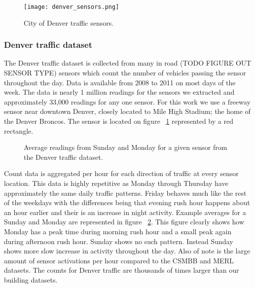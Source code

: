 \begin{figure}[t!]
	\begin{center}
		\texttt{[image: denver\_sensors.png]}
	\end{center}
	\caption{City of Denver traffic sensors.}
	\label{fig:denvertraffic}
\end{figure}


\subsubsection{Denver traffic dataset}
The Denver traffic dataset is collected from many in road (TODO FIGURE OUT SENSOR TYPE) sensors which count the number of vehicles passing the sensor throughout the day.  Data is available from 2008 to 2011 on most days of the week.  The data is nearly 1 million readings for the sensors we extracted and approximately 33,000 readings for any one sensor.  For this work we use a freeway sensor near downtown Denver, closely located to Mile High Stadium; the home of the Denver Broncos.  The sensor is located on figure ~\ref{fig:denvertraffic} represented by a red rectangle.

\begin{figure}[h]
	\begin{center}
	\end{center}
	\caption{Average readings from Sunday and Monday for a given sensor from the Denver traffic dataset.}
	\label{fig:denver_day_raw}
\end{figure}

Count data is aggregated per hour for each direction of traffic at every sensor location.  This data is highly repetitive as Monday through Thursday have approximately the same daily traffic patterns.  Friday behaves much like the rest of the weekdays with the differences being that evening rush hour happens about an hour earlier and their is an increase in night activity.   Example averages for a Sunday and Monday are represented in figure ~\ref{fig:denver_day_raw}.  This figure clearly shows how Monday has a peak time during morning rush hour and a small peak again during afternoon rush hour.  Sunday shows no such pattern.  Instead Sunday shows more slow increase in activity throughout the day.  Also of note is the large amount of sensor activations per hour compared to the CSMBB and MERL datasets.  The counts for Denver traffic are thousands of times larger than our building datasets.

